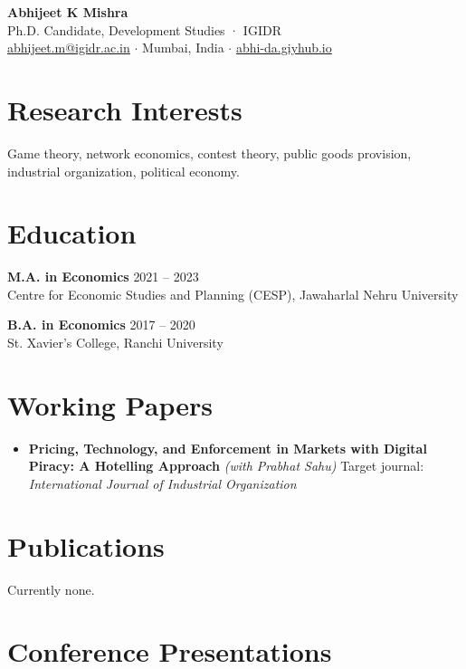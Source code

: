 \documentclass[11pt,letterpaper]{article}
\newcommand{\cvitem}[3]{%
  \noindent\textbf{#1} \hfill {\color{muted}#2}\\
  #3\par\vspace{0.55em}
}
\begin{document}
\begin{center}
  {\Huge\bfseries\color{accent} Abhijeet K Mishra}\\[0.3em]
{\color{muted} Ph.D. Candidate, Development Studies · IGIDR}\\[0.15em]  {\small \href{mailto:abhijeet.m@igidr.ac.in}{abhijeet.m@igidr.ac.in} \; $\cdot$ \; Mumbai, India \; $\cdot$ \; \href{https://abhi-da.giyhub.io}{abhi-da.giyhub.io}}
\end{center}
\vspace{0.6em}

\section*{Research Interests}

Game theory, network economics, contest theory, public goods provision, industrial organization, political economy.

\section*{Education}

\cvitem{M.A. in Economics}{2021 -- 2023}{%
Centre for Economic Studies and Planning (CESP), Jawaharlal Nehru University}
\cvitem{B.A. in Economics}{2017 -- 2020}{%
St. Xavier's College, Ranchi University}

\section*{Working Papers}

\begin{itemize}[leftmargin=1.1em, itemsep=0.5em, topsep=0pt]
  \item \textbf{Pricing, Technology, and Enforcement in Markets with Digital Piracy: A Hotelling Approach} \textit{(with Prabhat Sahu)} Target journal: \textit{International Journal of Industrial Organization}
\end{itemize}

\section*{Publications}

Currently none.

\section*{Conference Presentations}
\end{document}
